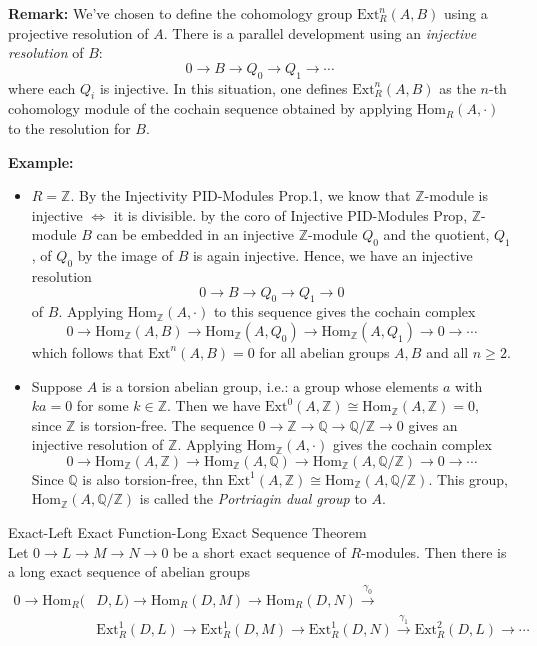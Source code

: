 \noindent\textbf{Remark:} We've chosen to define the cohomology group $\text{Ext}_R^n (A,B)$ using a projective resolution of $A$. There is a parallel development using an \textit{injective resolution} of $B$:
\[
0\to B\to Q_0\to Q_1 \to \cdots
\]
where each $Q_i$ is injective. In this situation, one defines $\text{Ext}_R^n (A,B)$ as the $n$-th cohomology module of the cochain sequence obtained by applying $\text{Hom}_R (A,\cdot)$ to the resolution for $B$.

\noindent\textbf{Example:} \begin{itemize}
    \item $R=\mathbb{Z}$. By the Injectivity PID-Modules Prop.1, we know that $\mathbb{Z}$-module is injective $\Leftrightarrow$ it is divisible. by the coro of Injective PID-Modules Prop, $\mathbb{Z}$-module $B$ can be embedded in an injective $\mathbb{Z}$-module $Q_0$ and the quotient, $Q_1$, of $Q_0$ by the image of $B$ is again injective. Hence, we have an injective resolution
    \[
    0\to B \to Q_0 \to Q_1 \to 0
    \]
    of $B$. Applying $\text{Hom}_\mathbb{Z} (A,\cdot)$ to this sequence gives the cochain complex
    \[
    0\to \text{Hom}_\mathbb{Z} (A,B) \to \text{Hom}_\mathbb{Z}(A,Q_0) \to \text{Hom}_\mathbb{Z} (A,Q_1) \to 0\to \cdots
    \]
    which follows that $\text{Ext}^n (A,B)=0$ for all abelian groups $A,B$ and all $n\geq 2$.

    \item Suppose $A$ is a torsion abelian group, i.e.: a group whose elements $a$ with $ka=0$ for some $k\in \mathbb{Z}$. Then we have $\text{Ext}^0 (A,\mathbb{Z}) \cong \text{Hom}_\mathbb{Z} (A,\mathbb{Z})=0$, since $\mathbb{Z}$ is torsion-free. The sequence $0\to \mathbb{Z} \to \mathbb{Q} \to \mathbb{Q}/\mathbb{Z} \to0$ gives an injective resolution of $\mathbb{Z}$. Applying $\text{Hom}_\mathbb{Z}(A,\cdot)$ gives the cochain complex
    \[
    0\to \text{Hom}_\mathbb{Z}(A,\mathbb{Z}) \to \text{Hom}_\mathbb{Z} (A,\mathbb{Q}) \to \text{Hom}_\mathbb{Z}(A, \mathbb{Q}/\mathbb{Z}) \to 0\to \cdots
    \]
    Since $\mathbb{Q}$ is also torsion-free, thn $\text{Ext}^1 (A,\mathbb{Z}) \cong \text{Hom}_\mathbb{Z} (A,\mathbb{Q}/ \mathbb{Z})$. This group, $\text{Hom}_\mathbb{Z} (A,\mathbb{Q}/\mathbb{Z} )$ is called the \textit{Portriagin dual group} to $A$.
\end{itemize}


\begin{theorem}{Exact-Left Exact Function-Long Exact Sequence Theorem}\\
Let $0\to L\to M\to N\to0$ be a short exact sequence of $R$-modules. Then there is a long exact sequence of abelian groups
\begin{align*}
    0 \to \text{Hom}_R (&D,L) \to \text{Hom}_R  (D,M) \to \text{Hom}_R (D,N) \xrightarrow{\gamma_0}\\
    &\text{Ext}_R^1 (D,L) \to \text{Ext}_R^1 (D,M)\to \text{Ext}_R^1 (D,N) \xrightarrow{\gamma_1} \text{Ext}_R^2 (D,L) \to \cdots
\end{align*}
\end{theorem}

